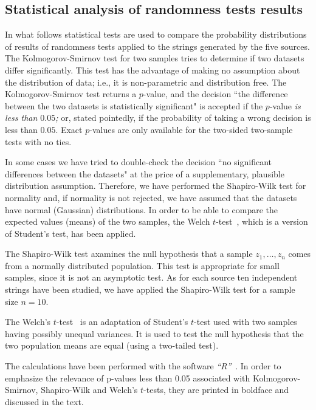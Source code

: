 \documentclass[10pt]{article}%
\begin{document}
\subsection{Statistical analysis of randomness tests results}

In what follows statistical tests are used to compare the probability
distributions of results of randomness tests applied to the strings generated by the
five sources.
The Kolmogorov-Smirnov test  for two samples \cite{Conover}
tries to determine if two datasets differ significantly.
This test
has the advantage of making no assumption about the distribution of data; i.e., it
is non-parametric and distribution free.
The Kolmogorov-Smirnov test returns a $p$-value,
and the decision ``the difference between the two datasets is statistically
significant" is accepted if the $p$-value {\em is less than $0.05$;}
or, stated pointedly, if the
probability of taking a wrong decision is less than $0.05$. Exact $p$-values are
only available for the two-sided two-sample tests with no ties.

In some cases we have tried to double-check the decision  ``no significant
differences between the datasets"  at the price of a supplementary, plausible
distribution assumption. Therefore, we have performed the Shapiro-Wilk test  for normality
\cite{Shapiro-Wilk} and, if normality is not rejected, we have assumed that the
datasets have normal (Gaussian) distributions.
In order to be able to compare the expected values (means) of the two samples,
the Welch $t$-test~\cite{Welch}, which is a version of Student's test, has been applied.

The Shapiro-Wilk test axamines the null hypothesis that a sample
$z_{1},\ldots ,z_{n}$ comes from a normally distributed population. This test is
appropriate for small samples, since it is not an asymptotic test.
As for each
source ten independent strings have been studied, we have applied the
Shapiro-Wilk test for a sample size $n = 10$.

The Welch's $t$-test~\cite{Welch} is an adaptation of Student's $t$-test  used
with two samples having possibly unequal variances. It is used to test the
null hypothesis that the two population means are equal (using a two-tailed test).

The calculations
have been performed with the software {\em ``R''}~\cite{rproject}.
In order to emphasize the relevance of p-values less than 0.05 associated with Kolmogorov-Smirnov,
Shapiro-Wilk and Welch's $t$-tests, they are printed in boldface and discussed in the text.
\end{document}
